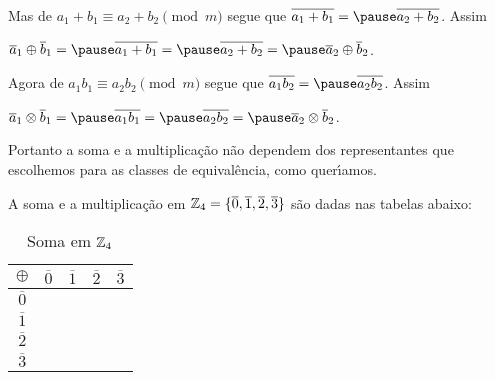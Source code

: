 \documentclass{beamer}
\begin{document}
    \begin{frame}
        Mas de $a_1 + b_1 \equiv a_2 + b_2 \pmod m$ \pause segue que $\overline{a_1 + b_1} =  \pause \overline{a_2 + b_2}$\pause. Assim
        \begin{center}
            $\overline{a}_{1}\oplus \overline{b}_{1} = \pause \overline{a_{1}+b_{1}} = \pause \overline{a_{2} + b_{2}} = \pause \overline{a}_{2}\oplus \overline{b}_{2}$.\pause
        \end{center}

        Agora de $a_1b_1 \equiv a_2b_2 \pmod m$ \pause segue que $\overline{a_1b_2} = \pause \overline{a_2b_2}$\pause. Assim
        \begin{center}
            $\overline{a}_{1}\otimes \overline{b}_{1} = \pause \overline{a_{1}b_{1}} = \pause \overline{a_{2}b_{2}} = \pause \overline{a}_{2}\otimes\overline{b}_{2}$.\pause
        \end{center}

        Portanto a soma e a multiplica\c{c}\~ao \pause n\~ao dependem dos representantes que escolhemos para as classes de equival\^encia, \pause como quer{\'\i}amos.\hspace{.3cm} \qedsymbol
    \end{frame}

    \begin{frame}
        \begin{exemplo}
            A soma e a multiplica{\c c}{\~a}o em $\mathbb{Z}_4 = \{\overline{0},\overline{1},\overline{2},\overline{3}\}$\pause
            s\~ao dadas nas tabelas abaixo:\pause
                \begin{table}[!htb]
                  \caption{Soma em $\mathbb{Z}_4$}
                  \begin{minipage}{.5\linewidth}
                    \centering
                    \begin{tabular}{|c|c|c|c|c|} 
                        \hline
                        $\oplus$ & $\overline{0}$ & $\overline{1}$ & $\overline{2}$ & $\overline{3}$\T\\
                        \hline
                        $\overline{0}$ & \phantom{abc} & \phantom{abc} & \phantom{abc} & \phantom{abc}\T\\
                        \hline
                        $\overline{1}$ & \phantom{abc} & \phantom{abc}& \phantom{abc} & \phantom{abc}\T\\
                        \hline
                        $\overline{2}$ & \phantom{abc} & \phantom{abc} & \phantom{abc} & \phantom{abc}\T\\
                        \hline
                        $\overline{3}$ & \phantom{abc} & \phantom{abc} & \phantom{abc} & \phantom{abc}\T\\
                        \hline
                    \end{tabular}
                  \end{minipage}
                \end{table}
        \end{exemplo}
    \end{frame}
\end{document}
